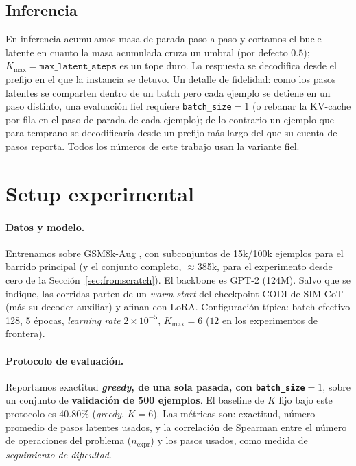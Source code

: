 \documentclass[11pt]{article}
\begin{document}
\subsection{Inferencia}
\label{sec:inferencia}

En inferencia acumulamos masa de parada paso a paso y cortamos el bucle latente en cuanto la masa acumulada cruza un umbral (por defecto $0.5$); $K_{\max} = \texttt{max\_latent\_steps}$ es un tope duro. La respuesta se decodifica desde el prefijo en el que la instancia se detuvo. Un detalle de fidelidad: como los pasos latentes se comparten dentro de un batch pero cada ejemplo se detiene en un paso distinto, una evaluación fiel requiere \texttt{batch\_size}$=1$ (o rebanar la KV-cache por fila en el paso de parada de cada ejemplo); de lo contrario un ejemplo que para temprano se decodificaría desde un prefijo más largo del que su cuenta de pasos reporta. Todos los números de este trabajo usan la variante fiel.

\section{Setup experimental}
\label{sec:setup}

\paragraph{Datos y modelo.} Entrenamos sobre GSM8k-Aug \citep{deng2024icot}, con subconjuntos de 15k/100k ejemplos para el barrido principal (y el conjunto completo, $\approx$385k, para el experimento desde cero de la Sección~\ref{sec:fromscratch}). El backbone es GPT-2 (124M). Salvo que se indique, las corridas parten de un \emph{warm-start} del checkpoint CODI de SIM-CoT (más su decoder auxiliar) y afinan con LoRA. Configuración típica: batch efectivo 128, 5 épocas, \textit{learning rate} $2\times10^{-5}$, $K_{\max}=6$ ($12$ en los experimentos de frontera).

\paragraph{Protocolo de evaluación.} Reportamos exactitud \textbf{\textit{greedy}, de una sola pasada, con \texttt{batch\_size}$=1$}, sobre un conjunto de \textbf{validación de 500 ejemplos}. El baseline de $K$ fijo bajo este protocolo es $\mathbf{40.80\%}$ (\textit{greedy}, $K=6$). Las métricas son: exactitud, número promedio de pasos latentes usados, y la correlación de Spearman entre el número de operaciones del problema ($n_{\text{expr}}$) y los pasos usados, como medida de \emph{seguimiento de dificultad}.
\end{document}
